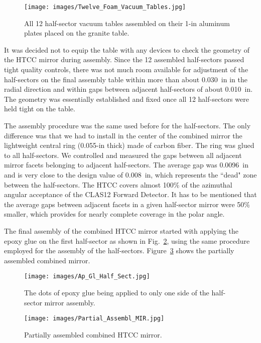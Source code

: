 \begin{figure}[ht]
    \centering
    \texttt{[image: images/Twelve\_Foam\_Vacuum\_Tables.jpg]}
    \caption{All 12 half-sector vacuum tables assembled on their 1-in aluminum plates placed on the granite table.}
    \label{fig:Twelve_Foam_Vacuum_Tables}
\end{figure}

It was decided not to equip the table with any devices to check the geometry of the HTCC mirror during assembly.
Since the 12 assembled half-sectors passed tight quality controls, there was not much room available for adjustment
of the half-sectors on the final assembly table within more than about 0.030~in in the radial direction and within gaps
between adjacent half-sectors of about 0.010~in. The geometry was essentially established and fixed once all 12
half-sectors were held tight on the table.

The assembly procedure was the same used before for the half-sectors. The only difference was that we had to
install in the center of the combined mirror the lightweight central ring (0.055-in thick) made of carbon fiber.
The ring was glued to all half-sectors. We controlled and measured the gaps between all adjacent mirror facets
belonging to adjacent half-sectors. The average gap was 0.0096~in and is very close to the design value of
0.008~in, which represents the ``dead" zone between the half-sectors. The HTCC covers almost 100\% of the
azimuthal angular acceptance of the CLAS12 Forward Detector. It has to be mentioned that the average gaps
between adjacent facets in a given half-sector mirror were 50\% smaller, which provides for nearly complete
coverage in the polar angle. 

The final assembly of the combined HTCC mirror started with applying the epoxy glue on the first half-sector as
shown in Fig.~\ref{fig:Ap_Gl_Half_Sect}, using the same procedure employed for the assembly of the
half-sectors. Figure~\ref{fig:Partial_Assembl_MIR} shows the partially assembled combined mirror.
 
\begin{figure}[ht]
    \centering
    \texttt{[image: images/Ap\_Gl\_Half\_Sect.jpg]}
    \caption{The dots of epoxy glue being applied to only one side of the half-sector mirror assembly.}
    \label{fig:Ap_Gl_Half_Sect}
\end{figure}
 
 \begin{figure}[ht]
    \centering
    \texttt{[image: images/Partial\_Assembl\_MIR.jpg]}
    \caption{ Partially assembled combined HTCC mirror.}
    \label{fig:Partial_Assembl_MIR}
\end{figure}

